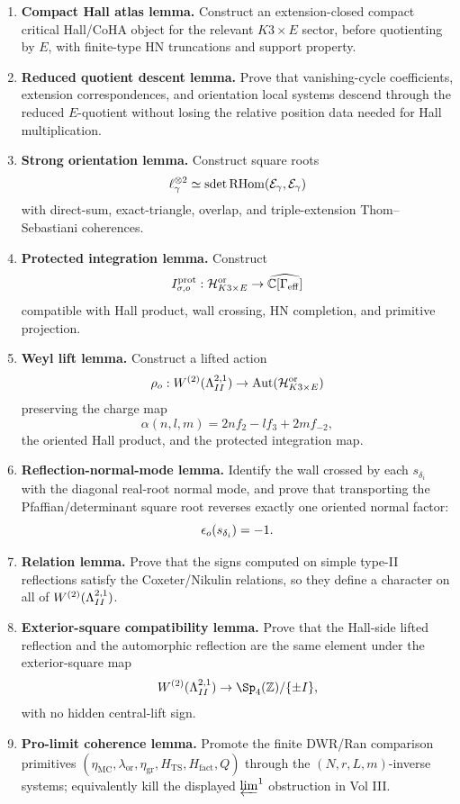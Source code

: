 \begin{enumerate}
\item \textbf{Compact Hall atlas lemma.}  Construct an extension-closed
compact critical Hall/CoHA object for the relevant \(K3\times E\) sector,
before quotienting by \(E\), with finite-type HN truncations and support
property.
\item \textbf{Reduced quotient descent lemma.}  Prove that vanishing-cycle
coefficients, extension correspondences, and orientation local systems
descend through the reduced \(E\)-quotient without losing the relative
position data needed for Hall multiplication.
\item \textbf{Strong orientation lemma.}  Construct square roots
\[
\ell_\gamma^{\otimes2}\simeq
\operatorname{sdet}\operatorname{RHom}(\mathcal E_\gamma,\mathcal E_\gamma)
\]
with direct-sum, exact-triangle, overlap, and triple-extension
Thom--Sebastiani coherences.
\item \textbf{Protected integration lemma.}  Construct
\[
I^{\mathrm{prot}}_{\sigma,o}:
\mathcal H^{\mathrm{or}}_{K3\times E}\to
\widehat{\mathbb C[\Gamma_{\mathrm{eff}}]}
\]
compatible with Hall product, wall crossing, HN completion, and primitive
projection.
\item \textbf{Weyl lift lemma.}  Construct a lifted action
\[
\rho_o:W^{(2)}(\Lambda^{2,1}_{II})
\to\operatorname{Aut}(\mathcal H^{\mathrm{or}}_{K3\times E})
\]
preserving the charge map
\[
\alpha(n,l,m)=2nf_2-lf_3+2mf_{-2},
\]
the oriented Hall product, and the protected integration map.
\item \textbf{Reflection-normal-mode lemma.}  Identify the wall crossed by
each \(s_{\delta_i}\) with the diagonal real-root normal mode, and prove
that transporting the Pfaffian/determinant square root reverses exactly
one oriented normal factor:
\[
\epsilon_o(s_{\delta_i})=-1.
\]
\item \textbf{Relation lemma.}  Prove that the signs computed on simple
type-II reflections satisfy the Coxeter/Nikulin relations, so they define
a character on all of \(W^{(2)}(\Lambda^{2,1}_{II})\).
\item \textbf{Exterior-square compatibility lemma.}  Prove that the
Hall-side lifted reflection and the automorphic reflection are the same
element under the exterior-square map
\[
W^{(2)}(\La^{2,1}_{II})\to \Sp_4(\Z)/\{\pm I\},
\]
with no hidden central-lift sign.
\item \textbf{Pro-limit coherence lemma.}  Promote the finite DWR/Ran
comparison primitives \((\eta_{\mathrm{MC}},\lambda_{\mathrm{or}},
\eta_{\mathrm{gr}},H_{\mathrm{TS}},H_{\mathrm{fact}},Q)\) through the
\((N,r,L,m)\)-inverse systems; equivalently kill the displayed
\(\varprojlim^1\) obstruction in Vol III.
\end{enumerate}

